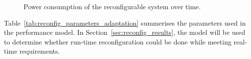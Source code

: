 \setcounter{subfigure}{0}
\begin{figure}[t!]
\centering
{}
\caption{Power consumption of the reconfigurable system over time.}
\label{fig:timing}
\end{figure}

Table~\ref{tab:reconfig_parameters_adaptation} summerises the parameters used in the performance model.
In Section~\ref{sec:reconfig_results}, the model will be used to determine whether run-time reconfiguration could be done while meeting real-time requirements.

